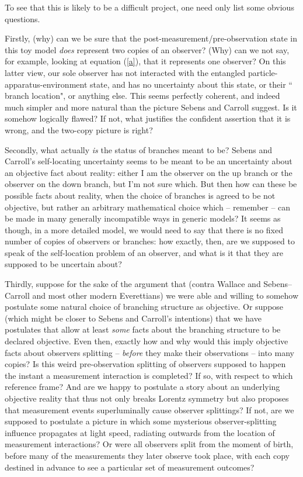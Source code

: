 \documentclass[aps,prl]{revtex4}
\begin{document}
To see that this is likely to be a difficult project, one
need only list some obvious questions.   

Firstly, 
(why) can we be sure that the post-measurement/pre-observation state in this toy
model {\it does} represent two copies of an observer? 
(Why) can we not say, for example, looking at equation (\ref{a}), that 
it represents one observer?   On this latter
view, our sole observer has not interacted with the entangled 
particle-apparatus-environment state, and
has no uncertainty about this state, or their
`` branch location", or anything else.   This seems perfectly coherent,
and indeed much simpler and more natural than the picture 
Sebens and Carroll suggest.   Is it somehow logically flawed?
If not, what justifies the confident assertion that it is wrong, and
the two-copy picture is right?   

Secondly, what actually {\it is} the status of branches meant to be?   
Sebens and Carroll's self-locating uncertainty
seems to be meant to be an uncertainty about an objective
fact about reality: either I am the observer on the up
branch or the observer on the down branch, but I'm not sure which.   
But then how can these be possible facts about reality, when
the choice of branches is agreed to be not objective,
but rather an arbitrary mathematical choice which -- remember --
can be made in many generally incompatible
ways in generic models?   It seems as though, in a more detailed
model, we would need to say that there is no fixed number of 
copies of observers or branches: how exactly, then, 
are we supposed to speak of the
self-location problem of an observer, and what is it that they
are supposed to be uncertain about?  

Thirdly, suppose for the sake of the argument
that (contra Wallace \cite{wallaceontology,wallace2012emergent} and 
Sebens--Carroll \cite{cs1,cs2} and most other modern Everettians) we  
were able and willing to somehow postulate 
some natural choice of branching structure as objective.
Or suppose (which might be closer to Sebens and Carroll's intentions)
that we have postulates that allow
at least {\it some} facts about the branching structure to be 
declared objective.    
Even then, exactly how
and why would this imply objective facts about observers
splitting -- {\it before} they make their observations -- into
many copies?   Is this weird pre-observation splitting
of observers supposed to happen the instant
a measurement interaction is completed?  If so, with 
respect to which reference frame?  And are we happy to 
postulate a story about an underlying objective reality
that thus not only breaks Lorentz symmetry but also
proposes that measurement events superluminally cause
observer splittings?  If not, are we
supposed to postulate a picture in which some mysterious
observer-splitting influence propagates at light speed,
radiating outwards from the location of measurement
interactions?  Or were all observers split from the
moment of birth, before many of the measurements they
later observe took place, with each copy destined in
advance to see a particular set of measurement outcomes? 
\end{document}
